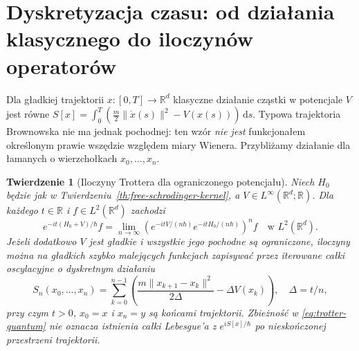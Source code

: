 \documentclass[11pt,a4paper,oneside]{report}
\numberwithin{equation}{chapter}
\theoremstyle{plain}
\newtheorem{twierdzenie}{Twierdzenie}[chapter]
\theoremstyle{definition}
\theoremstyle{remark}
\newcommand{\R}{\mathbb{R}}
\newcommand{\dd}{\mathrm{d}}
\begin{document}
\section{Dyskretyzacja czasu: od działania klasycznego do iloczynów operatorów}

Dla gładkiej trajektorii $x:[0,T]\to\R^d$ klasyczne
działanie cząstki w potencjale $V$ jest równe
$S[x]=\int_0^T(\frac m2\|\dot x(s)\|^2-V(x(s)))\,\dd s$.
Typowa trajektoria Brownowska nie ma jednak pochodnej:
ten wzór \emph{nie jest} funkcjonałem określonym prawie
wszędzie względem miary Wienera. Przybliżamy działanie
dla łamanych o wierzchołkach $x_0,\ldots,x_n$.

\begin{twierdzenie}[Iloczyny Trottera dla ograniczonego potencjału]
\label{th:QM-trotter}
Niech $H_0$ będzie jak w Twierdzeniu~\ref{th:free-schrodinger-kernel},
a $V\in L^\infty(\R^d;\R)$. Dla każdego $t\in\R$
i $f\in L^2(\R^d)$ zachodzi
\[
 e^{-it(H_0+V)/\hbar}f
 =\lim_{n\to\infty}
 \left(e^{-itV/(n\hbar)}e^{-itH_0/(n\hbar)}\right)^n f
 \quad\text{w }L^2(\R^d).
\tag{16.7}\label{eq:trotter-quantum}
\]
Jeżeli dodatkowo $V$ jest gładkie i wszystkie jego
pochodne są ograniczone, iloczyny można na gładkich
szybko malejących funkcjach zapisywać przez iterowane
całki oscylacyjne o dyskretnym działaniu
\[
 S_n(x_0,\ldots,x_n)
 =\sum_{k=0}^{n-1}\left(
    \frac{m\|x_{k+1}-x_k\|^2}{2\Delta}
    -\Delta V(x_k)\right),\quad\Delta=t/n,
\tag{16.8}\label{eq:discrete-action}
\]
przy czym $t>0$, $x_0=x$ i $x_n=y$ są końcami
trajektorii. Zbieżność w \eqref{eq:trotter-quantum}
nie oznacza istnienia całki Lebesgue'a z
$e^{iS[x]/\hbar}$ po nieskończonej przestrzeni trajektorii.
\end{twierdzenie}
\end{document}
